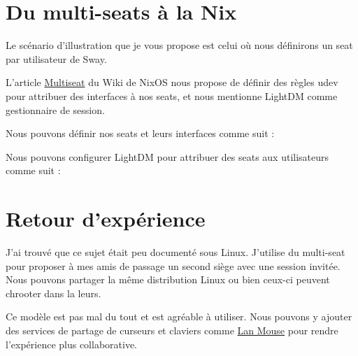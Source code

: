 \documentclass[a4paper,11pt]{article}
\begin{document}
\begin{blogmain}
\section{Du multi-seats à la Nix}
Le scénario d'illustration que je vous propose est celui où nous définirons un seat par utilisateur de Sway.

L'article \href{https://wiki.nixos.org/wiki/Multiseat}{Multiseat} du Wiki de NixOS nous propose de définir des règles udev pour attribuer des interfaces à nos seats, et nous mentionne LightDM comme gestionnaire de session.

Nous pouvons définir nos seats et leurs interfaces comme suit :

\newpage
Nous pouvons configurer LightDM pour attribuer des seats aux utilisateurs comme suit :

\section{Retour d'expérience}
J'ai trouvé que ce sujet était peu documenté sous Linux.
J'utilise du multi-seat pour proposer à mes amis de passage un second siège avec une session invitée.
Nous pouvons partager la même distribution Linux ou bien ceux-ci peuvent chrooter dans la leurs.

Ce modèle est pas mal du tout et est agréable à utiliser. Nous pouvons y ajouter des services de partage de curseurs et claviers comme \href{https://github.com/feschber/lan-mouse/tree/main}{Lan Mouse} pour rendre l'expérience plus collaborative.
\end{blogmain}
\end{document}
